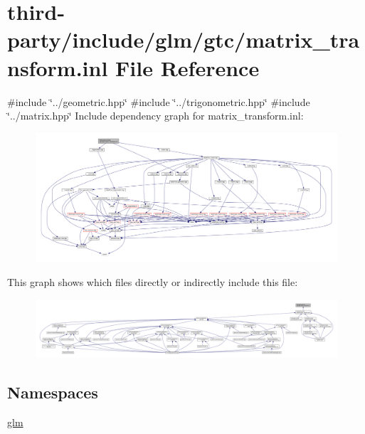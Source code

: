 \hypertarget{matrix__transform_8inl}{}\section{third-\/party/include/glm/gtc/matrix\+\_\+transform.inl File Reference}
\label{matrix__transform_8inl}
{\ttfamily \#include \char`\"{}../geometric.\+hpp\char`\"{}}\newline
{\ttfamily \#include \char`\"{}../trigonometric.\+hpp\char`\"{}}\newline
{\ttfamily \#include \char`\"{}../matrix.\+hpp\char`\"{}}\newline
Include dependency graph for matrix\+\_\+transform.\+inl\+:
\nopagebreak
\begin{figure}[H]
\begin{center}
\leavevmode
\includegraphics[width=350pt]{matrix__transform_8inl__incl}
\end{center}
\end{figure}
This graph shows which files directly or indirectly include this file\+:
\nopagebreak
\begin{figure}[H]
\begin{center}
\leavevmode
\includegraphics[width=350pt]{matrix__transform_8inl__dep__incl}
\end{center}
\end{figure}
\subsection*{Namespaces}
\begin{DoxyCompactItemize}
\item 
 \hyperlink{namespaceglm}{glm}
\end{DoxyCompactItemize}
